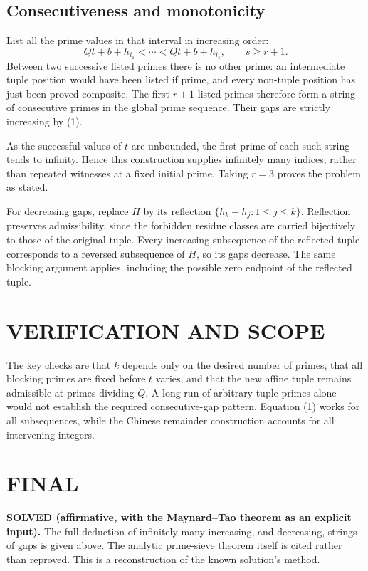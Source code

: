 \subsection{Consecutiveness and monotonicity}
List all the prime values in that interval in increasing order:
\[
 Qt+b+h_{i_1}<\cdots<Qt+b+h_{i_s},\qquad s\ge r+1.
\]
Between two successive listed primes there is no other prime: an intermediate tuple position would have been listed if prime, and every non-tuple position has just been proved composite. The first $r+1$ listed primes therefore form a string of consecutive primes in the global prime sequence. Their gaps are strictly increasing by (1).

As the successful values of $t$ are unbounded, the first prime of each such string tends to infinity. Hence this construction supplies infinitely many indices, rather than repeated witnesses at a fixed initial prime. Taking $r=3$ proves the problem as stated.

For decreasing gaps, replace $H$ by its reflection $\{h_k-h_j:1\le j\le k\}$. Reflection preserves admissibility, since the forbidden residue classes are carried bijectively to those of the original tuple. Every increasing subsequence of the reflected tuple corresponds to a reversed subsequence of $H$, so its gaps decrease. The same blocking argument applies, including the possible zero endpoint of the reflected tuple.

\section{VERIFICATION AND SCOPE}
The key checks are that $k$ depends only on the desired number of primes, that all blocking primes are fixed before $t$ varies, and that the new affine tuple remains admissible at primes dividing $Q$. A long run of arbitrary tuple primes alone would not establish the required consecutive-gap pattern. Equation (1) works for all subsequences, while the Chinese remainder construction accounts for all intervening integers.

\section{FINAL}
\textbf{SOLVED (affirmative, with the Maynard--Tao theorem as an explicit input).} The full deduction of infinitely many increasing, and decreasing, strings of gaps is given above. The analytic prime-sieve theorem itself is cited rather than reproved. This is a reconstruction of the known solution's method.

